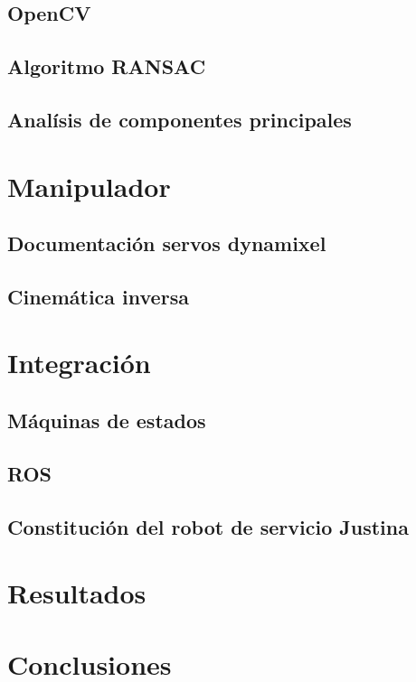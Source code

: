 \documentclass[a4paper, openright, 12pt]{report}
\begin{document}
	\section{OpenCV}
	\section{Algoritmo RANSAC}
	\section{Analísis de componentes principales}


\chapter{Manipulador}
	\section{Documentación servos dynamixel}
	\section{Cinemática inversa}


\chapter{Integración}
	\section{Máquinas de estados}
	\section{ROS}
	\section{Constitución del robot de servicio Justina}


\chapter{Resultados}


\chapter{Conclusiones}


\newpage{}




\end{document}
